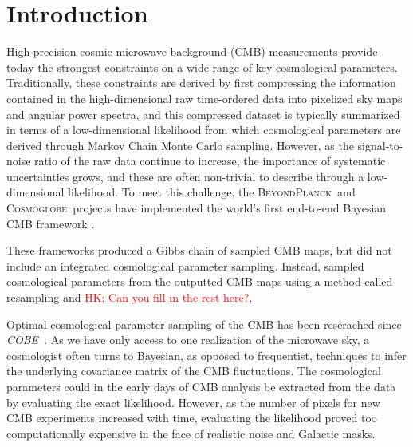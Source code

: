 \documentclass[twocolumn]{../common/aa}
\def\COBE{\emph{COBE}}
\newcommand{\BP}{\textsc{BeyondPlanck}}
\newcommand{\cosmoglobe}{\textsc{Cosmoglobe}}
\begin{document}

\maketitle

\tableofcontents




\section{Introduction}
\label{sec:introduction}

  High-precision cosmic microwave background (CMB) measurements provide today the strongest constraints on a wide range of key cosmological parameters. Traditionally, these constraints are derived by first compressing the information contained in the high-dimensional raw time-ordered data into pixelized sky maps and angular power spectra, and this compressed dataset is typically summarized in terms of a low-dimensional likelihood from which cosmological parameters are derived through Markov Chain Monte Carlo sampling. However, as the signal-to-noise ratio of the raw data continue to increase, the importance of systematic uncertainties grows, and these are often non-trivial to describe through a low-dimensional likelihood. To meet this challenge, the \BP\ and \cosmoglobe\ projects have implemented the world's first end-to-end Bayesian CMB framework \citep{bp01, watts2023_dr1}.

  These frameworks produced a Gibbs chain of sampled CMB maps, but did not include an integrated cosmological parameter sampling.  Instead, \citet{bp12} sampled cosmological parameters from the outputted CMB maps using a method called resampling and \textcolor{red}{HK: Can you fill in the rest here?}.

Optimal cosmological parameter sampling of the CMB has been reserached since \COBE\ \citep{smoot1995}. As we have only access to one realization of the microwave sky, a cosmologist often turns to Bayesian, as opposed to frequentist, techniques to infer the underlying covariance matrix of the CMB fluctuations. The cosmological parameters could in the early days of CMB analysis be extracted from the data by evaluating the exact likelihood. However, as the number of pixels for new CMB experiments increased with time, evaluating the likelihood proved too computationally expensive in the face of realistic noise and Galactic masks.
\end{document}
